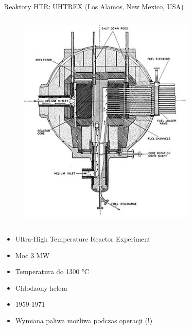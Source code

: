 \begin{columnframe}{Reaktory HTR: UHTREX (Los Alamos, New Mexico, USA)}
    \begin{column}{0.5\textwidth}
        \begin{figure}
            \centering
            \includegraphics[width=0.8\textwidth, frame]{images/UHTREX_core_drawing.jpg}
        \end{figure}
    \end{column}
    \begin{column}{0.5\textwidth}
        \begin{itemize}
            \item Ultra-High Temperature Reactor Experiment
            \item Moc 3 MW
            \item Temperatura do 1300 \si{\degreeCelsius}
            \item Chłodzony helem
            \item 1959-1971
            \item Wymiana paliwa możliwa podczas operacji (!)
        \end{itemize}
    \end{column}
\end{columnframe}

